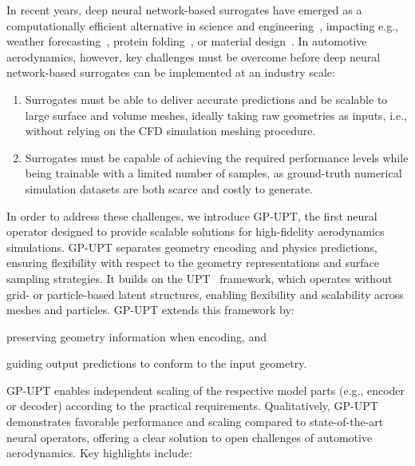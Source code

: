 In recent years, deep neural network-based surrogates have emerged as a computationally efficient alternative in science and engineering~\cite{Thuerey:21,Zhang:23,brunton2020machine}, impacting e.g., weather forecasting~\cite{pathak2022fourcastnet,bi2023accurate,lam2023learning,Nguyen:23,bodnar2024aurora}, protein folding~\cite{jumper2021highly,abramson2024accurate}, or material design~\cite{merchant2023scaling, zeni2023mattergen, yang2024mattersim}.
In automotive aerodynamics, however, key challenges must be overcome before deep neural network-based surrogates can be implemented at an industry scale:
\begin{enumerate}[label={(\Roman*)}, noitemsep,topsep=0pt]
\item \label{challenge1} Surrogates must be able to deliver accurate predictions and be scalable to large surface and volume meshes, ideally taking raw geometries as inputs,
i.e., without relying on the \ac{CFD} simulation meshing procedure.
\item \label{challenge2} Surrogates must be capable of achieving the required performance levels while being trainable with a limited number of samples, as ground-truth numerical simulation datasets are both scarce and costly to generate.
\end{enumerate}
In order to address these challenges, we introduce \acf{GP-UPT}, the first neural operator designed to provide scalable solutions for high-fidelity aerodynamics simulations. 
\ac{GP-UPT} separates geometry encoding and physics predictions, ensuring flexibility with respect to the geometry representations and surface sampling strategies.
It builds on the \acf{UPT}~\cite{alkin2024universal} framework, which operates without grid- or particle-based latent structures, enabling flexibility and scalability across meshes and particles. \ac{GP-UPT} extends this framework by:
\begin{enumerate*}[label={(\roman*)}]
    \item preserving geometry information when encoding, and
    \item guiding output predictions to conform to the input geometry.
\end{enumerate*}
\ac{GP-UPT} enables independent scaling of the respective model parts (e.g., encoder or decoder) according to the practical requirements.
Qualitatively, \ac{GP-UPT} demonstrates favorable performance and scaling compared to state-of-the-art neural operators, offering a clear solution to open challenges of automotive aerodynamics. 
Key highlights include: 
